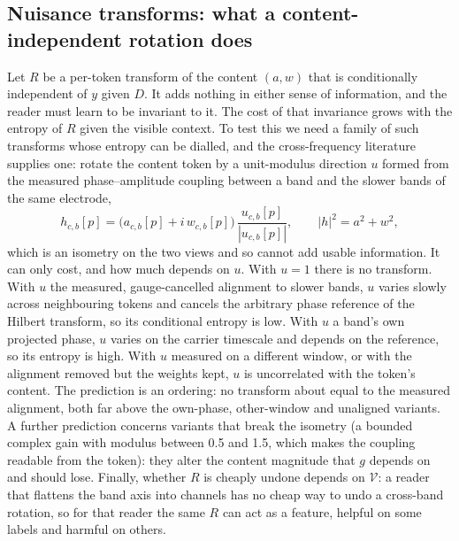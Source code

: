 \subsection{Nuisance transforms: what a content-independent rotation does}
\label{sec:nuisance}
Let $R$ be a per-token transform of the content $(a, w)$ that is conditionally independent of $y$ given $D$. It adds nothing in either sense of information, and the reader must learn to be invariant to it. The cost of that invariance grows with the entropy of $R$ given the visible context. To test this we need a family of such transforms whose entropy can be dialled, and the cross-frequency literature supplies one: rotate the content token by a unit-modulus direction $u$ formed from the measured phase--amplitude coupling between a band and the slower bands of the same electrode,
\begin{equation}
h_{c,b}[p] = \big(a_{c,b}[p] + i\,w_{c,b}[p]\big)\,\frac{u_{c,b}[p]}{|u_{c,b}[p]|}, \qquad |h|^2 = a^2 + w^2,
\label{eq:rotation}
\end{equation}
which is an isometry on the two views and so cannot add usable information. It can only cost, and how much depends on $u$. With $u = 1$ there is no transform. With $u$ the measured, gauge-cancelled alignment to slower bands, $u$ varies slowly across neighbouring tokens and cancels the arbitrary phase reference of the Hilbert transform, so its conditional entropy is low. With $u$ a band's own projected phase, $u$ varies on the carrier timescale and depends on the reference, so its entropy is high. With $u$ measured on a different window, or with the alignment removed but the weights kept, $u$ is uncorrelated with the token's content. The prediction is an ordering: no transform about equal to the measured alignment, both far above the own-phase, other-window and unaligned variants. A further prediction concerns variants that break the isometry (a bounded complex gain with modulus between 0.5 and 1.5, which makes the coupling readable from the token): they alter the content magnitude that $g$ depends on and should lose. Finally, whether $R$ is cheaply undone depends on $\mathcal{V}$: a reader that flattens the band axis into channels has no cheap way to undo a cross-band rotation, so for that reader the same $R$ can act as a feature, helpful on some labels and harmful on others.

